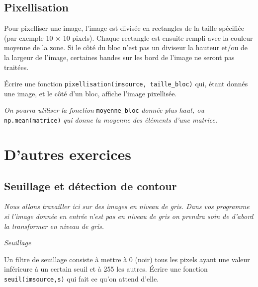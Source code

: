 \documentclass[10pt,a4paper,pdftex]{book}
\begin{document}
\subsection{Pixellisation}

\begin{exoc}{}

Pour pixelliser une image, l'image est divisée en rectangles de la taille spécifiée (par exemple 10 $\times$ 10 pixels). Chaque rectangle est ensuite rempli avec la couleur moyenne de la zone. Si le côté du bloc n'est pas un diviseur la hauteur et/ou de la largeur de l'image, certaines bandes sur les bord de l'image ne seront pas traitées.

Écrire une fonction \texttt{pixellisation(imsource, taille\_bloc)} qui, étant donnés une image, et le côté d'un bloc, affiche l'image pixellisée.

\textit{On pourra utiliser la fonction} \verb!moyenne_bloc! \textit{donnée plus haut, ou} \texttt{np.mean(matrice)} \textit{qui donne la moyenne des éléments d'une matrice.}

\end{exoc}


\section{D'autres exercices}

\subsection{Seuillage et détection de contour}

\begin{center}
\textit{Nous allons travailler ici sur des images en niveau de gris. Dans vos programme si l'image donnée en entrée n'est pas en niveau de gris on prendra soin de d'abord la transformer en niveau de gris.}
\end{center}

\begin{exoc}{\textit{Seuillage}}

Un filtre de seuillage consiste à mettre à 0 (noir) tous les pixels ayant une valeur inférieure à un certain seuil et à 255 les autres.
Écrire une fonction \texttt{seuil(imsource,s)} qui fait ce qu'on attend d'elle.
\end{exoc}
\end{document}
